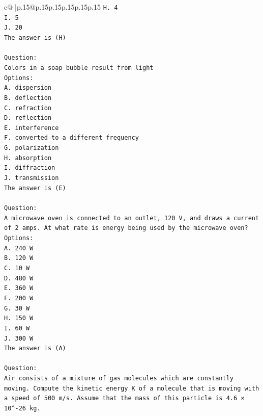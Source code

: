 \documentclass{article}
\begin{document}
{\begin{supertabular}{c@{$\;$}|p{.15\linewidth}@{}p{.15\linewidth}p{.15\linewidth}p{.15\linewidth}p{.15\linewidth}p{.15\linewidth}}
{{{\texttt{H. 4} \\
\texttt{I. 5} \\
\texttt{J. 20} \\
\texttt{The answer is (H)} \\
\\ 
\texttt{Question:} \\
\texttt{Colors in a soap bubble result from light} \\
\texttt{Options:} \\
\texttt{A. dispersion} \\
\texttt{B. deflection} \\
\texttt{C. refraction} \\
\texttt{D. reflection} \\
\texttt{E. interference} \\
\texttt{F. converted to a different frequency} \\
\texttt{G. polarization} \\
\texttt{H. absorption} \\
\texttt{I. diffraction} \\
\texttt{J. transmission} \\
\texttt{The answer is (E)} \\
\\ 
\texttt{Question:} \\
\texttt{A microwave oven is connected to an outlet, 120 V, and draws a current of 2 amps. At what rate is energy being used by the microwave oven?} \\
\texttt{Options:} \\
\texttt{A. 240 W} \\
\texttt{B. 120 W} \\
\texttt{C. 10 W} \\
\texttt{D. 480 W} \\
\texttt{E. 360 W} \\
\texttt{F. 200 W} \\
\texttt{G. 30 W} \\
\texttt{H. 150 W} \\
\texttt{I. 60 W} \\
\texttt{J. 300 W} \\
\texttt{The answer is (A)} \\
\\ 
\texttt{Question:} \\
\texttt{Air consists of a mixture of gas molecules which are constantly moving. Compute the kinetic energy K of a molecule that is moving with a speed of 500 m/s. Assume that the mass of this particle is 4.6 × 10\^{}{-}26 kg.} \\
}}}
\end{supertabular}}
\end{document}

